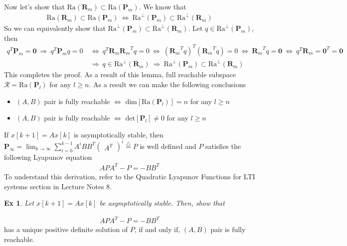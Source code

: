 \documentclass[twoside]{article}
\newtheorem{exmp}[theorem]{Ex}
\begin{document}
Now let's show that $\mathrm{Ra}( \mathbf{R}_m ) \subset \mathrm{Ra}( \mathbf{P}_m )$. We know that
%
\begin{align*}
    \mathrm{Ra}( \mathbf{R}_m ) \subset \mathrm{Ra}( \mathbf{P}_m ) 
    \ \iff \ \mathrm{Ra}^\perp( \mathbf{P}_m ) \subset \mathrm{Ra}^\perp( \mathbf{R}_m )
\end{align*}
%
So we can equivalently show that $\mathrm{Ra}^\perp( \mathbf{P}_m ) \subset \mathrm{Ra}^\perp( \mathbf{R}_m )$.
Let $q \in \mathrm{Ra}^\perp( \mathbf{P}_m )$, then
%
%
\begin{align*}
    q^T \mathbf{P}_m = \mathbf{0} \ \Rightarrow \ q^T \mathbf{P}_m q = 0 \ &\iff \ q^T \mathbf{R}_m {\mathbf{R}_m}^T q = 0
    \ \iff \ ( {\mathbf{R}_m}^T q )^T ( {\mathbf{R}_m}^T q ) = 0
    \ \iff \ {\mathbf{R}_m}^T q = \mathbf{0} \ \iff \ q^T {\mathbf{R}_m} = \mathbf{0}^T = \mathbf{0}  
    \\ \ &\Rightarrow \ q \in \mathrm{Ra}^\perp( \mathbf{R}_m ) \ \Rightarrow \ \mathrm{Ra}^\perp( \mathbf{P}_m ) \subset \mathrm{Ra}^\perp( \mathbf{R}_m )
\end{align*}
%
This completes the proof. As a result of this lemma, full reachable subspace $\mathcal{R} = \mathrm{Ra}( \mathbf{P}_l )$ for any $l \geq n$.
As a result we can make the following conclusions 
\begin{itemize}
\item $(A,B)$ pair is fully reachable $\iff$ $\mathrm{dim} \left [\mathrm{Ra}( \mathbf{P}_l ) \right] = n$ for any $l \geq n$
\item $(A,B)$ pair is fully reachable $\iff$ $\mathrm{det} \left [\mathbf{P}_l\right] \neq 0$ for any $l \geq n$
\end{itemize}
% 
If $x[k+1] = A x[k]$ is asymptotically stable, then $\textbf{P}_{\infty} = \lim_{k \to \infty} \sum\limits_{i=0}^{k-1} A^i B B^T \begin{pmatrix} A^T \end{pmatrix}^i \stackrel{\triangle}{=} P$ is well defined and $P$ satisfies the following Lyapunov equation
%
\begin{align*}
 A P A^T - P = -B B^T
\end{align*}
%
To understand this derivation, refer to the Quadratic Lyapunov Functions for LTI systems section in Lecture Notes 8. 
%
\begin{exmp}
 Let $x[k+1] = Ax [k]$ be asymptotically stable. Then, show that  
\end{exmp}
%
\begin{align*}
 A P A^T - P = -B B^T
\end{align*}
%
has a unique positive definite solution of $P$, if and only if, $(A,B)$ pair is fully reachable.
\end{document}
